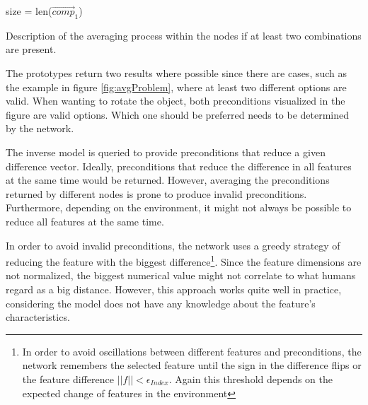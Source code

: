 \begin{algorithm}
	\BlankLine
	size = len($\vec{comp}_1$) \\
	\caption{Description of the averaging process within the nodes if at least two combinations are present.}
	\label{alg:averaging}
\end{algorithm}

The prototypes return two results where possible since there are cases, such as the example in figure \ref{fig:avgProblem}, where at least two different options are valid. When wanting to rotate the object, both preconditions visualized in the figure are valid options. Which one should be preferred needs to be determined by the network.

The inverse model is queried to provide preconditions that reduce a given difference vector. Ideally, preconditions that reduce the difference in all features at the same time would be returned. 
However, averaging the preconditions returned by different nodes is prone to produce invalid preconditions. 
Furthermore, depending on the environment, it might not always be possible to reduce all features at the same time. 

In order to avoid invalid preconditions, the network uses a greedy strategy of reducing the feature with the biggest difference\footnote{In order to avoid oscillations between different features and preconditions, the network remembers the selected feature until the sign in the difference flips or the feature difference $||f|| < \epsilon_{Index}$. Again this threshold depends on the expected change of features in the environment}. Since the feature dimensions are not normalized, the biggest numerical value might not correlate to what humans regard as a big distance. 
However, this approach works quite well in practice, considering the model does not have any knowledge about the feature's characteristics. 

